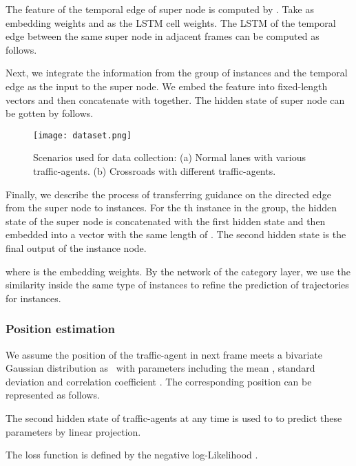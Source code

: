 \documentclass[letterpaper]{article} \usepackage{aaai19}  \usepackage{times}  \usepackage{helvet}  \usepackage{courier}  \usepackage{url}  \usepackage{graphicx}  \usepackage{amsmath}
\begin{document}
The feature  of the temporal edge of super node is computed by . Take  as embedding weights and  as the LSTM cell weights. The LSTM of the temporal edge between the same super node in adjacent frames can be computed as follows.
  
   
 
 \noindent Next, we integrate the information from the group of instances and the temporal edge as the input to the super node. We embed the feature  into fixed-length vectors and then concatenate with  together. The hidden state  of super node can be gotten by follows. 
 
    
   
   
 \begin{figure}
\texttt{[image: dataset.png]}
\caption{Scenarios used for data collection: (a) Normal lanes with various traffic-agents. (b) Crossroads with different traffic-agents.}
\label{fig:data_scene}
\vspace{-3ex}
\end{figure}
   
\noindent Finally, we describe the process of transferring guidance on the directed edge from the super node to instances. For the th instance in the group, the hidden state of the super node is concatenated with the first hidden state  and then embedded into a vector with the same length of . The second hidden state  is the final output of the instance node. 
 
 
   
 \noindent where  is the embedding weights. By the network of the category layer, we use the similarity inside the same type of instances to refine the prediction of trajectories for instances.


\subsubsection{Position estimation}
We assume the position of the traffic-agent in next frame meets a bivariate Gaussian distribution as~\cite{alahi2016social} with parameters including the mean , standard deviation  and correlation coefficient . The corresponding position can be represented as follows.

 

The second hidden state of traffic-agents at any time is used to to predict these parameters by linear projection.
 
The loss function is defined by the negative log-Likelihood .
\end{document}
